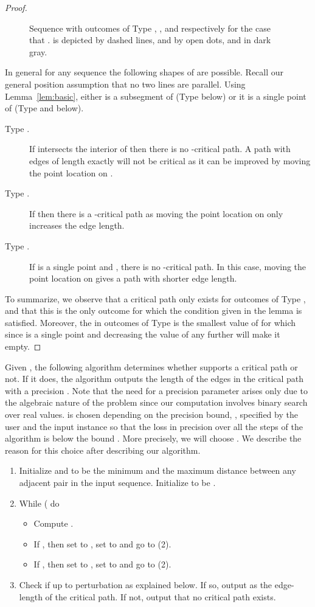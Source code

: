\begin{proof}
\begin{figure}[h]
\caption{Sequence  with outcomes of Type ,
  , and  respectively for the case that
  .   is depicted
  by dashed lines,  and 
  by open dots, and  in dark gray.}
\label{fig:em}
\end{figure}
In general for any sequence  the following shapes of  are possible. Recall our general position assumption that no two lines are parallel. Using Lemma~\ref{lem:basic}, either  is a subsegment  of  (Type  below) or it is a single point of  (Type  and  below).
\begin{description}
\item[Type .] If  intersects the interior of  then there is
  no -critical path.   A path with edges of length exactly  will not be critical as it can be improved by moving the point location on . \item[Type .] If  then there is a -critical path   as moving the point location
on  only increases the edge length.  \item[Type .] If  is a single point and ,  there is no -critical path.   In this case, moving the point location on  gives a path with shorter edge length. \end{description}
To summarize, we observe that a critical path only exists for outcomes of Type , and that this is the only outcome for which the condition given in the lemma is satisfied. Moreover, the  in outcomes of Type  is the smallest value of  for which   since  is a single point and decreasing the value of  any further will make it empty. 
\end{proof}

Given , the following algorithm determines whether   supports a critical path or not. If it does, the algorithm outputs the length of the edges in the critical path with a precision . Note that the need for a precision parameter arises only due to the algebraic nature of the problem since our computation involves binary search over real values.  is chosen depending on the precision bound, , specified by the user and the input instance so that the loss in precision over all the steps of the algorithm is below the bound . More precisely, we will choose .  We describe the reason for this choice after describing our algorithm. 

\begin{enumerate}
\item
Initialize  and  to be the minimum and the maximum distance between any adjacent pair  in the input sequence. Initialize
 to be .
\item
While ( do\\
\begin{itemize}
\item Compute .
\item If , then set  to , set  to  and go to (2).
\item If , then set   to , set  to  and go to (2).
\end{itemize}
\item
Check if  up to perturbation  as explained below. If so, output  as the edge-length of the critical path. If not, output that no critical path exists.
\end{enumerate}


